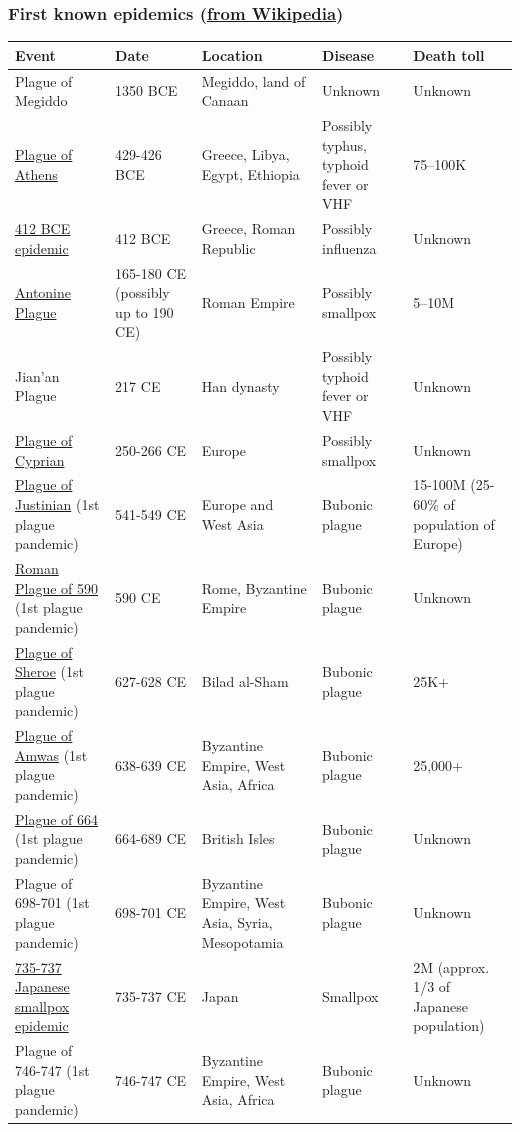 \documentclass[aspectratio=169]{beamer}\usepackage[]{graphicx}\usepackage[]{xcolor}
\begin{document}
\begin{frame}[allowframebreaks]
\frametitle{First known epidemics (\href{https://en.wikipedia.org/wiki/List_of_epidemics}{from Wikipedia})}

\begin{longtable}{m{}m{}m{}m{}m{}}
\hline
Event & Date & Location & Disease & Death toll \\
\hline
Plague of Megiddo & 1350 BCE & Megiddo, land of Canaan & Unknown & Unknown \\ 
\href{https://en.wikipedia.org/wiki/Plague_of_Athens}{Plague of Athens} & 429-426 BCE & Greece, Libya, Egypt, Ethiopia & Possibly typhus, typhoid fever or VHF & 75–100K \\
\href{https://en.wikipedia.org/wiki/412_BC_epidemic}{412 BCE epidemic} & 412 BCE & Greece, Roman Republic & Possibly influenza & Unknown \\
\href{https://en.wikipedia.org/wiki/Antonine_Plague}{Antonine Plague} & 165-180 CE (possibly up to 190 CE) & Roman Empire & Possibly smallpox & 5–10M \\
Jian'an Plague & 217 CE & Han dynasty & Possibly typhoid fever or VHF & Unknown \\
\href{https://en.wikipedia.org/wiki/Plague_of_Cyprian}{Plague of Cyprian} & 250-266 CE & Europe & Possibly smallpox & Unknown \\
\href{https://en.wikipedia.org/wiki/Plague_of_Justinian}{Plague of Justinian} (1st plague pandemic) & 541-549 CE & Europe and West Asia & Bubonic plague & 15-100M (25-60\% of population of Europe) \\ 
\href{https://en.wikipedia.org/wiki/Roman_Plague_of_590}{Roman Plague of 590} (1st plague pandemic) & 590 CE & Rome, Byzantine Empire & Bubonic plague & Unknown \\
\href{https://en.wikipedia.org/wiki/Plague_of_Sheroe}{Plague of Sheroe} (1st plague pandemic) & 627-628 CE & Bilad al-Sham & Bubonic plague & 25K+ \\
\href{https://en.wikipedia.org/wiki/Plague_of_Amwas}{Plague of Amwas} (1st plague pandemic) & 638-639 CE & Byzantine Empire, West Asia, Africa & Bubonic plague & 25,000+ \\
\href{https://en.wikipedia.org/wiki/Plague_of_664}{Plague of 664} (1st plague pandemic) & 664-689 CE & British Isles & Bubonic plague & Unknown \\
Plague of 698-701 (1st plague pandemic) & 698-701 CE & Byzantine Empire, West Asia, Syria, Mesopotamia & Bubonic plague & Unknown \\
\href{https://en.wikipedia.org/wiki/735\%E2\%80\%93737_Japanese_smallpox_epidemic}{735-737 Japanese smallpox epidemic} & 735-737 CE & Japan & Smallpox & 2M (approx. 1/3 of Japanese population) \\ 
Plague of 746-747 (1st plague pandemic) & 746-747 CE & Byzantine Empire, West Asia, Africa & Bubonic plague & Unknown \\
\hline
\end{longtable}
\end{frame}
\end{document}
